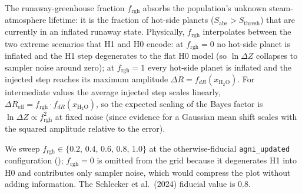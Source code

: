 The runaway-greenhouse fraction $f_\mathrm{rgh}$ absorbs the population's
unknown steam-atmosphere lifetime: it is the fraction of hot-side
planets ($S_\mathrm{abs} > S_\mathrm{thresh}$) that are currently in an
inflated runaway state.  Physically, $f_\mathrm{rgh}$ interpolates
between the two extreme scenarios that H1 and H0 encode: at
$f_\mathrm{rgh}=0$ no hot-side planet is inflated and the H1 step
degenerates to the flat H0 model (so $\ln\Delta Z$ collapses to sampler
noise around zero); at $f_\mathrm{rgh}=1$ every hot-side planet is
inflated and the injected step reaches its maximum amplitude
$\Delta R = f_{dR}(x_{\mathrm{H_2O}})$.  For intermediate values the
average injected step scales linearly, $\Delta R_\mathrm{eff}
= f_\mathrm{rgh} \cdot f_{dR}(x_{\mathrm{H_2O}})$, so the expected
scaling of the Bayes factor is $\ln\Delta Z \propto f_\mathrm{rgh}^2$
at fixed noise (since evidence for a Gaussian mean shift scales with
the squared amplitude relative to the error).

We sweep $f_\mathrm{rgh} \in \{0.2,\,0.4,\,0.6,\,0.8,\,1.0\}$ at the
otherwise-fiducial \texttt{agni\_updated} configuration
(); $f_\mathrm{rgh}=0$ is omitted from the
grid because it degenerates H1 into H0 and contributes only sampler
noise, which would compress the plot without adding information.  The
Schlecker et al.\ (2024) fiducial value is $0.8$.

